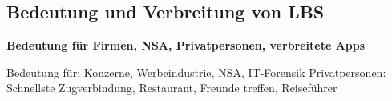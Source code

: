 \subsection{Bedeutung und Verbreitung von LBS}

\textbf{Bedeutung für Firmen, NSA, Privatpersonen, verbreitete Apps}

Bedeutung für: Konzerne, Werbeindustrie, NSA, IT-Forensik \linebreak
Privatpersonen: Schnellste Zugverbindung, Restaurant, Freunde treffen, Reiseführer
